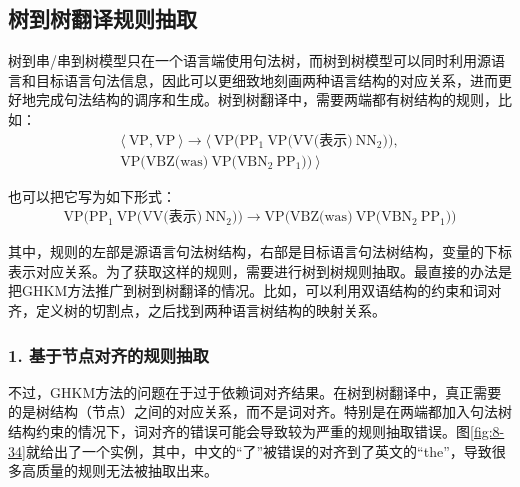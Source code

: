 
\subsection{树到树翻译规则抽取}

\parinterval 树到串/串到树模型只在一个语言端使用句法树，而树到树模型可以同时利用源语言和目标语言句法信息，因此可以更细致地刻画两种语言结构的对应关系，进而更好地完成句法结构的调序和生成。树到树翻译中，需要两端都有树结构的规则，比如：
\begin{eqnarray}
\langle\ \textrm{VP},\textrm{VP}\ \rangle \rightarrow \langle\ \textrm{VP(}\textrm{PP}_1\ \textrm{VP(VV(表示)}\ \textrm{NN}_2\textrm{))}, \nonumber \\
\textrm{VP(VBZ(was)}\ \textrm{VP(}\textrm{VBN}_2\ \textrm{PP}_1\textrm{))}\ \rangle \nonumber
\end{eqnarray}

\parinterval 也可以把它写为如下形式：
\begin{eqnarray}
\textrm{VP(}\textrm{PP}_1\ \textrm{VP(VV(表示)}\ \textrm{NN}_2\textrm{))} \rightarrow \textrm{VP(VBZ(was)}\ \textrm{VP(}\textrm{VBN}_2\ \textrm{PP}_1\textrm{))} \nonumber
\end{eqnarray}

\noindent 其中，规则的左部是源语言句法树结构，右部是目标语言句法树结构，变量的下标表示对应关系。为了获取这样的规则，需要进行树到树规则抽取。最直接的办法是把GHKM方法推广到树到树翻译的情况。比如，可以利用双语结构的约束和词对齐，定义树的切割点，之后找到两种语言树结构的映射关系。


\subsubsection{1. 基于节点对齐的规则抽取}

\parinterval 不过，GHKM方法的问题在于过于依赖词对齐结果。在树到树翻译中，真正需要的是树结构（节点）之间的对应关系，而不是词对齐。特别是在两端都加入句法树结构约束的情况下，词对齐的错误可能会导致较为严重的规则抽取错误。图\ref{fig:8-34}就给出了一个实例，其中，中文的“了”被错误的对齐到了英文的“the”，导致很多高质量的规则无法被抽取出来。

